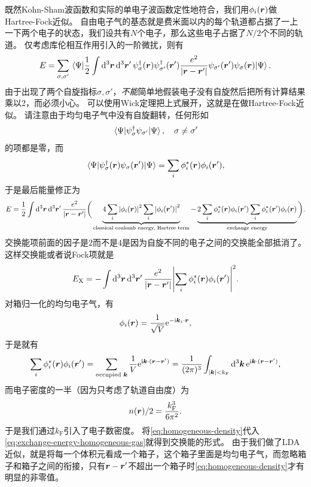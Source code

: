既然Kohn-Sham波函数和实际的单电子波函数定性地符合，我们用$\phi_i(\vb*{r})$做Hartree-Fock近似。
自由电子气的基态就是费米面以内的每个轨道都占据了一上一下两个电子的状态，我们设共有$N$个电子，那么这些电子占据了$N/2$个不同的轨道。
仅考虑库伦相互作用引入的一阶微扰，则有
\[
    E = \sum_{\sigma, \sigma'} \mel{\Psi}{
        \frac{1}{2} \int \dd[3]{\vb*{r}} \dd[3]{\vb*{r}'} {\psi}^\dagger_{\sigma}(\vb*{r}) {\psi}^\dagger_{\sigma'}(\vb*{r}') \frac{e^2}{\abs{\vb*{r} - \vb*{r}'}} {\psi}_{\sigma'}(\vb*{r}') {\psi}_\sigma(\vb*{r})
    }{\Psi}.
\]
由于出现了两个自旋指标$\sigma, \sigma'$，\emph{不能}简单地假装电子没有自旋然后把所有计算结果乘以2，而必须小心。
可以使用Wick定理把上式展开，这就是在做Hartree-Fock近似。
请注意由于均匀电子气中没有自旋翻转，任何形如
\[
    \mel{\Psi}{{\psi}_\sigma^\dagger {\psi}_{\sigma'}}{\Psi}, \quad \sigma \neq \sigma'
\]
的项都是零，而
\[
    \mel{\Psi}{{\psi}^\dagger_\sigma(\vb*{r}) {\psi}_{\sigma}(\vb*{r}')}{\Psi} = \sum_i \phi_i^*(\vb*{r}) \phi_i(\vb*{r}'),
\]
于是最后能量修正为
\[
    E = \frac{1}{2} \int \dd[3]{\vb*{r}} \dd[3]{\vb*{r}'} \frac{e^2}{\abs{\vb*{r} - \vb*{r}'}} \bigg(
        \underbrace{4 \sum_{i} \abs{\phi_i(\vb*{r})}^2 \sum_{i} \abs{\phi_i(\vb*{r}')}^2}_\text{classical coulomb energy, Hartree term} - \underbrace{2 \sum_i \phi_i^*(\vb*{r}) \phi_i(\vb*{r}') \sum_i \phi_i^*(\vb*{r}') \phi_i(\vb*{r})}_\text{exchange energy}
    \bigg).
\]
交换能项前面的因子是$2$而不是$4$是因为自旋不同的电子之间的交换能全部抵消了。这样交换能或者说Fock项就是
\begin{equation}
    E_\text{X} = - \int \dd[3]{\vb*{r}} \dd[3]{\vb*{r}'} \frac{e^2}{\abs{\vb*{r} - \vb*{r}'}} \abs{\sum_i \phi_i^*(\vb*{r}) \phi_i(\vb*{r}')}^2 . 
    \label{eq:exchange-energy-homogeneous-gas}
\end{equation}
对箱归一化的均匀电子气，有
\[
    \phi_i(\vb*{r}) = \frac{1}{\sqrt{V}} \mathrm{e}^{- \mathrm{i} \vb*{k}_i \cdot \vb*{r}},
\]
于是就有
\begin{equation}
    \sum_i \phi_i^*(\vb*{r}) \phi_i(\vb*{r}') = \sum_{\text{occupied $\vb*{k}$}} \frac{1}{V} \mathrm{e}^{\mathrm{i} \vb*{k} \cdot (\vb*{r} - \vb*{r}')} = \frac{1}{(2\pi)^3} \int_{\abs{\vb*{k}} < k_\text{F}} \dd[3]{\vb*{k}} \mathrm{e}^{\mathrm{i} \vb*{k} \cdot (\vb*{r} - \vb*{r}')},
    \label{eq:homogeneous-density}
\end{equation}
而电子密度的一半（因为只考虑了轨道自由度）为
\[
    n(\vb*{r}) / 2 = \frac{k_\text{F}^3}{6 \pi^2}.
\]
于是我们通过$k_\text{F}$引入了电子数密度。
将\eqref{eq:homogeneous-density}代入\eqref{eq:exchange-energy-homogeneous-gas}就得到交换能的形式。
由于我们做了LDA近似，就是将每一个体积元看成一个箱子，这个箱子里面是均匀电子气，而忽略箱子和箱子之间的衔接，只有$\vb*{r} - \vb*{r}'$不超出一个箱子时\eqref{eq:homogeneous-density}才有明显的非零值。
